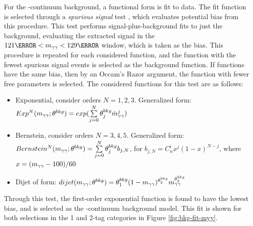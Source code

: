 For the \yy-continuum background, a functional form is fit to data. The fit function is selected through a \textit{spurious signal} test \cite{spurious-signal-diphoton}, which evaluates potential bias from this procedure. This test performs signal-plus-background fits to just the background, evaluating the extracted signal in the $\unit{121}{\GeV} < \myy < \unit{129}{\GeV}$ window, which is taken as the bias. This procedure is repeated for each considered function, and the function with the fewest spurious signal events is selected as the background function. If functions have the same bias, then by an Occam's Razor argument, the function with fewer free parameters is selected. The considered functions for this test are as follows:
\begin{itemize}
  \item Exponential, consider orders $N=1,2,3$. Generalized form: $Exp^N (m_{\gamma\gamma} ; \theta^{bkg}) = exp(\sum\limits_{j=0}^{N} \theta_j^{bkg} \dot m_{\gamma\gamma}^j)$
  \item Bernstein, consider orders $N=3,4,5$. Generalized form: $Bernstein^N (m_{\gamma\gamma} ; \theta^{bkg}) = \sum\limits_{j=0}^{N} \theta_j^{bkg} b_{j,N}$, for $b_{j,N} = C_n^i x^j (1-x)^{N-j}$, where $x= (m_{\gamma\gamma}-100)/60$
  \item Dijet of form: $dijet(m_{\gamma\gamma} ; \theta^{bkg}) = \theta_1^{bkg} (1-m_{\gamma\gamma})^{\theta_2^{bkg}} m_{\gamma\gamma}^{\theta_3^{bkg}}$
\end{itemize}

Through this test, the first-order exponential function is found to have the lowest bias, and is selected as the \yy-continuum background model. This fit is shown for both selections in the 1 and 2-tag categories in Figure \ref{fig:bkg-fit-myy}.

